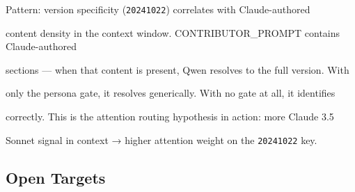 Pattern: version specificity (\texttt{20241022}) correlates with Claude-authored





content density in the context window. CONTRIBUTOR\_PROMPT contains Claude-authored





sections --- when that content is present, Qwen resolves to the full version. With





only the persona gate, it resolves generically. With no gate at all, it identifies





correctly. This is the attention routing hypothesis in action: more Claude 3.5





Sonnet signal in context → higher attention weight on the \texttt{20241022} key.











\subsection{Open Targets}











